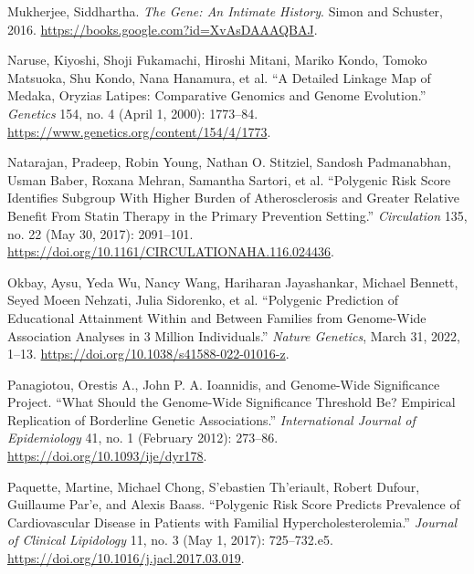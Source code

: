 \documentclass[
]{book}
\newlength{\cslhangindent}
\newlength{\cslentryspacingunit} %
\newenvironment{CSLReferences}[2] %
 {%
  \setlength{\parindent}{0pt}
  \ifodd #1
  \let\oldpar\par
  \def\par{\hangindent=\cslhangindent\oldpar}
  \fi
  \setlength{\parskip}{#2\cslentryspacingunit}
 }%
 {}
\begin{document}
\begin{CSLReferences}{1}{0}
\leavevmode{}%
Mukherjee, Siddhartha. \emph{The {Gene}: {An Intimate History}}. {Simon and Schuster}, 2016. \url{https://books.google.com?id=XvAsDAAAQBAJ}.

\leavevmode{}%
Naruse, Kiyoshi, Shoji Fukamachi, Hiroshi Mitani, Mariko Kondo, Tomoko Matsuoka, Shu Kondo, Nana Hanamura, et al. {``A {Detailed Linkage Map} of {Medaka}, {Oryzias} Latipes: {Comparative Genomics} and {Genome Evolution}.''} \emph{Genetics} 154, no. 4 (April 1, 2000): 1773--84. \url{https://www.genetics.org/content/154/4/1773}.

\leavevmode{}%
Natarajan, Pradeep, Robin Young, Nathan O. Stitziel, Sandosh Padmanabhan, Usman Baber, Roxana Mehran, Samantha Sartori, et al. {``Polygenic {Risk Score Identifies Subgroup With Higher Burden} of {Atherosclerosis} and {Greater Relative Benefit From Statin Therapy} in the {Primary Prevention Setting}.''} \emph{Circulation} 135, no. 22 (May 30, 2017): 2091--101. \url{https://doi.org/10.1161/CIRCULATIONAHA.116.024436}.

\leavevmode{}%
Okbay, Aysu, Yeda Wu, Nancy Wang, Hariharan Jayashankar, Michael Bennett, Seyed Moeen Nehzati, Julia Sidorenko, et al. {``Polygenic Prediction of Educational Attainment Within and Between Families from Genome-Wide Association Analyses in 3 Million Individuals.''} \emph{Nature Genetics}, March 31, 2022, 1--13. \url{https://doi.org/10.1038/s41588-022-01016-z}.

\leavevmode{}%
Panagiotou, Orestis A., John P. A. Ioannidis, and Genome-Wide Significance Project. {``What Should the Genome-Wide Significance Threshold Be? {Empirical} Replication of Borderline Genetic Associations.''} \emph{International Journal of Epidemiology} 41, no. 1 (February 2012): 273--86. \url{https://doi.org/10.1093/ije/dyr178}.

\leavevmode{}%
Paquette, Martine, Michael Chong, S'ebastien Th'eriault, Robert Dufour, Guillaume Par'e, and Alexis Baass. {``Polygenic Risk Score Predicts Prevalence of Cardiovascular Disease in Patients with Familial Hypercholesterolemia.''} \emph{Journal of Clinical Lipidology} 11, no. 3 (May 1, 2017): 725--732.e5. \url{https://doi.org/10.1016/j.jacl.2017.03.019}.


\end{CSLReferences}
\end{document}
